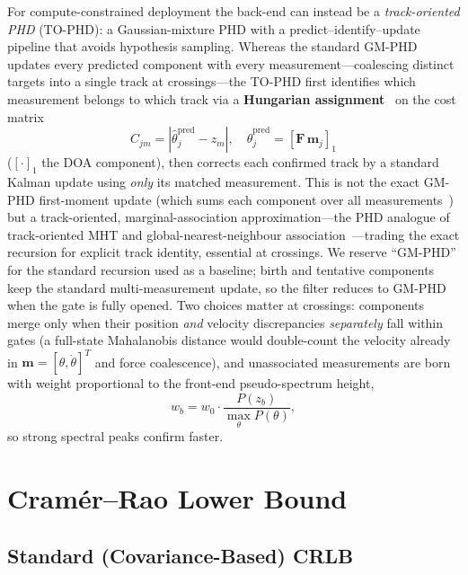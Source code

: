 \documentclass[journal]{IEEEtran}
\newcommand{\mat}[1]{\mathbf{#1}}
\begin{document}
For compute-constrained deployment the back-end can instead be a \emph{track-oriented PHD} (TO-PHD): a Gaussian-mixture PHD with a predict--identify--update pipeline that avoids hypothesis sampling. Whereas the standard GM-PHD updates every predicted component with every measurement---coalescing distinct targets into a single track at crossings---the TO-PHD first identifies which measurement belongs to which track via a \textbf{Hungarian assignment}~\cite{kuhn1955hungarian} on the cost matrix
\begin{equation}
C_{jm} = |\hat{\theta}_j^{\mathrm{pred}} - z_m|, \quad
\hat{\theta}_j^{\mathrm{pred}} = [\mat{F}\,\mat{m}_j]_1
\label{eq:hungarian_cost}
\end{equation}
($[\cdot]_1$ the DOA component), then corrects each confirmed track by a standard Kalman update using \emph{only} its matched measurement. This is not the exact GM-PHD first-moment update (which sums each component over all measurements~\cite{vo2006gmphd}) but a track-oriented, marginal-association approximation---the PHD analogue of track-oriented MHT and global-nearest-neighbour association~\cite{barshalom2011tracking}---trading the exact recursion for explicit track identity, essential at crossings. We reserve ``GM-PHD'' for the standard recursion used as a baseline; birth and tentative components keep the standard multi-measurement update, so the filter reduces to GM-PHD when the gate is fully opened. Two choices matter at crossings: components merge only when their position \emph{and} velocity discrepancies \emph{separately} fall within gates (a full-state Mahalanobis distance would double-count the velocity already in $\mat{m}=[\theta,\dot\theta]^T$ and force coalescence), and unassociated measurements are born with weight proportional to the front-end pseudo-spectrum height,
\begin{equation}
w_b = w_0 \cdot \frac{P(z_b)}{\max_\theta P(\theta)},
\label{eq:birth_weight}
\end{equation}
so strong spectral peaks confirm faster.

\section{Cram\'{e}r--Rao Lower Bound}
\label{sec:crlb}

\subsection{Standard (Covariance-Based) CRLB}
\end{document}
